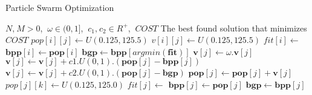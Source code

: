 \begin{algorithm}[ht]
\caption{Particle Swarm Optimization}
\label{alg:pso}
\begin{algorithmic}
\Require $N\text{,}\:M > 0$,  $\:\omega \in (0,1]$, $\:c_1\text{,}\:c_2 \in R^+ $, $\:COST$
\Ensure The best found solution that minimizes $COST$
\State $pop[i][j] \gets U(0.125,125.5)$ 
\State $v[i][j] \gets U(0.125,125.5)$
\EndFor
\State $fit[i] \gets$ 
\State $\boldsymbol{bpp}[i] \gets \boldsymbol{pop}[i]$ 
\EndFor
\State $\boldsymbol{bgp} \gets \boldsymbol{bpp}[argmin(\boldsymbol{fit})]$
\State $\boldsymbol{v}[j] \gets \omega.\boldsymbol{v}[j]$
\State $\boldsymbol{v}[j] \gets \boldsymbol{v}[j] + c1.U(0,1).(\boldsymbol{pop}[j] - \boldsymbol{bpp}[j])$
\State $\boldsymbol{v}[j] \gets \boldsymbol{v}[j] + c2.U(0,1).(\boldsymbol{pop}[j] - \boldsymbol{bgp})$
\State $\boldsymbol{pop}[j] \gets \boldsymbol{pop}[j] + \boldsymbol{v}[j]$
\State $pop[j][k] \gets U(0.125,125.0)$
\EndIf
\EndFor
\State $fit[j] \gets$ 
\State $\boldsymbol{bpp}[j] \gets \boldsymbol{pop}[j]$
\EndIf
{}
\State $\boldsymbol{bgp} \gets \boldsymbol{bpp}[j]$
\EndIf
\EndFor
\EndFor
\end{algorithmic}
\end{algorithm}

